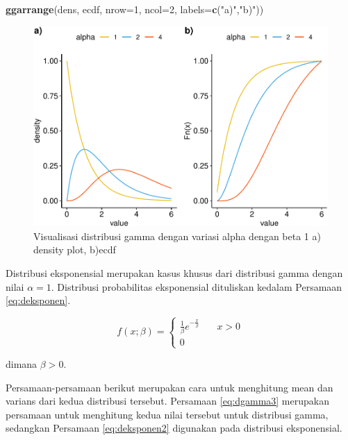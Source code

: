 \documentclass[]{book}
\newenvironment{Shaded}{\begin{snugshade}}{\end{snugshade}}
\newcommand{\KeywordTok}[1]{\textcolor[rgb]{0.13,0.29,0.53}{\textbf{#1}}}
\newcommand{\DataTypeTok}[1]{\textcolor[rgb]{0.13,0.29,0.53}{#1}}
\newcommand{\DecValTok}[1]{\textcolor[rgb]{0.00,0.00,0.81}{#1}}
\newcommand{\StringTok}[1]{\textcolor[rgb]{0.31,0.60,0.02}{#1}}
\newcommand{\NormalTok}[1]{#1}
\begin{document}
\begin{Shaded}
\begin{Highlighting}[]
\KeywordTok{ggarrange}\NormalTok{(dens, ecdf, }\DataTypeTok{nrow=}\DecValTok{1}\NormalTok{, }\DataTypeTok{ncol=}\DecValTok{2}\NormalTok{, }\DataTypeTok{labels=}\KeywordTok{c}\NormalTok{(}\StringTok{"a)"}\NormalTok{,}\StringTok{"b)"}\NormalTok{))}
\end{Highlighting}
\end{Shaded}

\begin{figure}

{\centering \includegraphics[width=0.9\linewidth]{EnvStat_files/figure-latex/gammavis-1} 

}

\caption{Visualisasi distribusi gamma dengan variasi alpha dengan beta 1 a) density plot, b)ecdf}\label{fig:gammavis}
\end{figure}

Distribusi eksponensial merupakan kasus khusus dari distribusi gamma
dengan nilai \(\alpha=1\). Distribusi probabilitas eksponensial
dituliskan kedalam Persamaan \eqref{eq:deksponen}.

\begin{equation}
f\left(x;\beta \right) =
  \begin{cases}
    \frac{1}{\beta}e^{-\frac{x}{\beta}}       & \quad x>0\\
    0                   & \quad\text{}
    \end{cases}
 \label{eq:deksponen}
\end{equation}

dimana \(\beta>0\).

Persamaan-persamaan berikut merupakan cara untuk menghitung mean dan
varians dari kedua distribusi tersebut. Persamaan \eqref{eq:dgamma3}
merupakan persamaan untuk menghitung kedua nilai tersebut untuk
distribusi gamma, sedangkan Persamaan \eqref{eq:deksponen2} digunakan pada
distribusi eksponensial.
\end{document}

